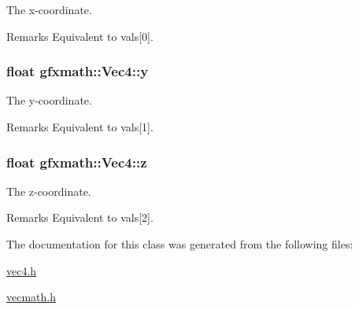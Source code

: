 The x-\/coordinate. 

\begin{DoxyRemark}{Remarks}
Equivalent to vals\mbox{[}0\mbox{]}. 
\end{DoxyRemark}
\hypertarget{classgfxmath_1_1_vec4_a95e0ca27d66d7e0223606c20d326b595}{}
\subsubsection[{y}]{\setlength{\rightskip}{0pt plus 5cm}float gfxmath\+::\+Vec4\+::y}\label{classgfxmath_1_1_vec4_a95e0ca27d66d7e0223606c20d326b595}


The y-\/coordinate. 

\begin{DoxyRemark}{Remarks}
Equivalent to vals\mbox{[}1\mbox{]}. 
\end{DoxyRemark}
\hypertarget{classgfxmath_1_1_vec4_acd626b757468a5ea39f98812a36c4419}{}
\subsubsection[{z}]{\setlength{\rightskip}{0pt plus 5cm}float gfxmath\+::\+Vec4\+::z}\label{classgfxmath_1_1_vec4_acd626b757468a5ea39f98812a36c4419}


The z-\/coordinate. 

\begin{DoxyRemark}{Remarks}
Equivalent to vals\mbox{[}2\mbox{]}. 
\end{DoxyRemark}


The documentation for this class was generated from the following files\+:\begin{DoxyCompactItemize}
\item 
\hyperlink{vec4_8h}{vec4.\+h}\item 
\hyperlink{vecmath_8h}{vecmath.\+h}\end{DoxyCompactItemize}
